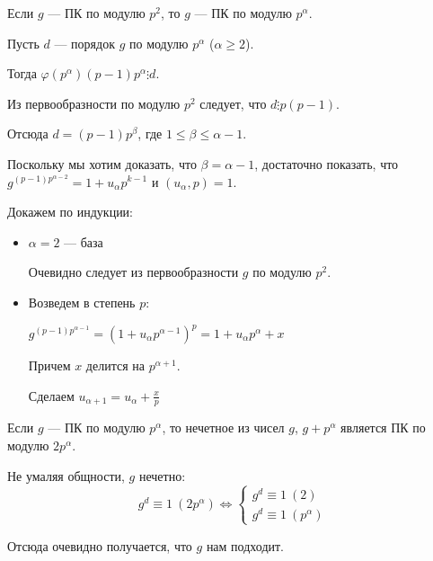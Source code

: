 \begin{lemma}{}{}
    Если \( g \) --- ПК по модулю \( p^2 \), то \( g \) --- ПК по модулю \( p^{\alpha} \).
\end{lemma}

Пусть \( d \) --- порядок \( g \) по модулю \( p^{\alpha} \) (\( \alpha \geq 2 \)).

Тогда \( \varphi(p^{\alpha}) (p - 1) p^{\alpha} \vdots d \).

Из первообразности по модулю \( p^2 \) следует, что \( d \vdots p(p - 1) \).

Отсюда \( d = (p - 1)p^{\beta} \), где \( 1 \leq \beta \leq \alpha - 1 \).

Поскольку мы хотим доказать, что \( \beta = \alpha - 1 \),
достаточно показать, что \( g^{(p - 1) p^{\alpha - 2}} = 1 + u_{\alpha} p^{k - 1} \) и \( (u_{\alpha}, p) = 1 \).

Докажем по индукции:
\begin{itemize}
    \item
        \( \alpha = 2 \) --- база

        Очевидно следует из первообразности \( g \) по модулю \( p^2 \).
    \item
        Возведем в степень \( p \):

        \( g^{(p - 1) p^{\alpha - 1}} = (1 + u_{\alpha} p^{\alpha - 1})^p = 1 + u_{\alpha} p^{\alpha} + x \)

        Причем \( x \) делится на \( p^{\alpha + 1} \).

        Сделаем \( u_{\alpha + 1} = u_{\alpha} + \frac{x}{p} \)
\end{itemize}

\begin{lemma}{}{}
    Если \( g \) --- ПК по модулю \( p^{\alpha} \),
    то нечетное из чисел \( g \), \( g + p^{\alpha} \)
    является ПК по модулю \( 2p^{\alpha} \).
\end{lemma}

Не умаляя общности, \( g \) нечетно:
\[
    g^d \equiv 1 \: (2 p^{\alpha})
    \Leftrightarrow
    \begin{cases}
        g^d \equiv 1 \: (2)
        \\
        g^d \equiv 1 \: (p^{\alpha})
    \end{cases}
\]

Отсюда очевидно получается, что \( g \) нам подходит.
